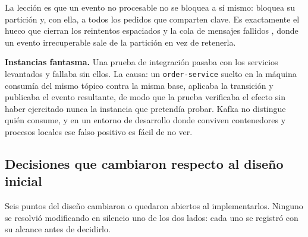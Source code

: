 \documentclass[12pt,a4paper]{article}
\begin{document}
La lección es que un evento no procesable no se bloquea a sí mismo: bloquea su partición y, con ella, a todos los pedidos que comparten clave. Es exactamente el hueco que cierran los reintentos espaciados y la cola de mensajes fallidos \cite{spring-kafka-retry}, donde un evento irrecuperable sale de la partición en vez de retenerla.

\textbf{Instancias fantasma.} Una prueba de integración pasaba con los servicios levantados y fallaba sin ellos. La causa: un \texttt{order-service} suelto en la máquina consumía del mismo tópico contra la misma base, aplicaba la transición y publicaba el evento resultante, de modo que la prueba verificaba el efecto sin haber ejercitado nunca la instancia que pretendía probar. Kafka no distingue quién consume, y en un entorno de desarrollo donde conviven contenedores y procesos locales ese falso positivo es fácil de no ver.

\subsection{Decisiones que cambiaron respecto al diseño inicial}

Seis puntos del diseño cambiaron o quedaron abiertos al implementarlos. Ninguno se resolvió modificando en silencio uno de los dos lados: cada uno se registró con su alcance antes de decidirlo.
\end{document}
